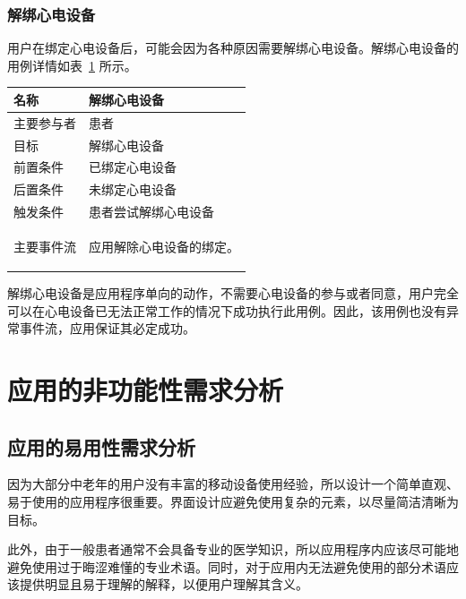 \subsubsection{解绑心电设备}

用户在绑定心电设备后，可能会因为各种原因需要解绑心电设备。解绑心电设备的用例详情如表~\ref{tab:uc-unbind-device} 所示。

\begin{table}[!ht]
    \label{tab:uc-unbind-device}
    \begin{tabularx}{\textwidth}{|l|X|}
        \hline
        名称    & 解绑心电设备     \\
        \hline
        主要参与者 & 患者         \\
        \hline
        目标    & 解绑心电设备     \\
        \hline
        前置条件  & 已绑定心电设备    \\
        \hline
        后置条件  & 未绑定心电设备    \\
        \hline
        触发条件  & 患者尝试解绑心电设备 \\
        \hline
        主要事件流 &
        \begin{itemizec}
            \item[1.] 应用解除心电设备的绑定。
        \end{itemizec} \\
        \hline
    \end{tabularx}
\end{table}

解绑心电设备是应用程序单向的动作，不需要心电设备的参与或者同意，用户完全可以在心电设备已无法正常工作的情况下成功执行此用例。因此，该用例也没有异常事件流，应用保证其必定成功。


\section{应用的非功能性需求分析}\label{sec:nonfunc-req}

\subsection{应用的易用性需求分析}\label{subsec:usability}

因为大部分中老年的用户没有丰富的移动设备使用经验，所以设计一个简单直观、易于使用的应用程序很重要。界面设计应避免使用复杂的元素，以尽量简洁清晰为目标。

此外，由于一般患者通常不会具备专业的医学知识，所以应用程序内应该尽可能地避免使用过于晦涩难懂的专业术语。同时，对于应用内无法避免使用的部分术语应该提供明显且易于理解的解释，以便用户理解其含义。

